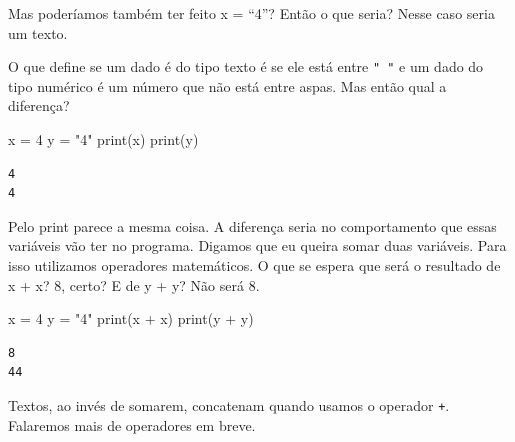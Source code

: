 \documentclass[
  letterpaper,
  DIV=11,
  numbers=noendperiod]{scrreprt}
\newenvironment{Shaded}{\begin{snugshade}}{\end{snugshade}}
\newcommand{\BuiltInTok}[1]{\textcolor[rgb]{0.00,0.23,0.31}{#1}}
\newcommand{\DecValTok}[1]{\textcolor[rgb]{0.68,0.00,0.00}{#1}}
\newcommand{\NormalTok}[1]{\textcolor[rgb]{0.00,0.23,0.31}{#1}}
\newcommand{\OperatorTok}[1]{\textcolor[rgb]{0.37,0.37,0.37}{#1}}
\newcommand{\StringTok}[1]{\textcolor[rgb]{0.13,0.47,0.30}{#1}}
\begin{document}
Mas poderíamos também ter feito x = ``4''? Então o que seria? Nesse caso
seria um texto.

O que define se um dado é do tipo texto é se ele está entre
\texttt{"\ "} e um dado do tipo numérico é um número que não está entre
aspas. Mas então qual a diferença?

\begin{Shaded}
\begin{Highlighting}[]
\NormalTok{x }\OperatorTok{=} \DecValTok{4}
\NormalTok{y }\OperatorTok{=} \StringTok{"4"}
\BuiltInTok{print}\NormalTok{(x)}
\BuiltInTok{print}\NormalTok{(y)}
\end{Highlighting}
\end{Shaded}

\begin{tcolorbox}[enhanced jigsaw, breakable, leftrule=.75mm, left=2mm, opacityback=0, bottomrule=.15mm, toprule=.15mm, rightrule=.15mm, arc=.35mm, colback=white]

\begin{verbatim}
4
4
\end{verbatim}

\end{tcolorbox}

Pelo print parece a mesma coisa. A diferença seria no comportamento que
essas variáveis vão ter no programa. Digamos que eu queira somar duas
variáveis. Para isso utilizamos operadores matemáticos. O que se espera
que será o resultado de x + x? 8, certo? E de y + y? Não será 8.

\begin{Shaded}
\begin{Highlighting}[]
\NormalTok{x }\OperatorTok{=} \DecValTok{4}
\NormalTok{y }\OperatorTok{=} \StringTok{"4"}
\BuiltInTok{print}\NormalTok{(x }\OperatorTok{+}\NormalTok{ x)}
\BuiltInTok{print}\NormalTok{(y }\OperatorTok{+}\NormalTok{ y)}
\end{Highlighting}
\end{Shaded}

\begin{tcolorbox}[enhanced jigsaw, breakable, leftrule=.75mm, left=2mm, opacityback=0, bottomrule=.15mm, toprule=.15mm, rightrule=.15mm, arc=.35mm, colback=white]

\begin{verbatim}
8
44
\end{verbatim}

\end{tcolorbox}

Textos, ao invés de somarem, concatenam quando usamos o operador
\texttt{+}. Falaremos mais de operadores em breve.
\end{document}
